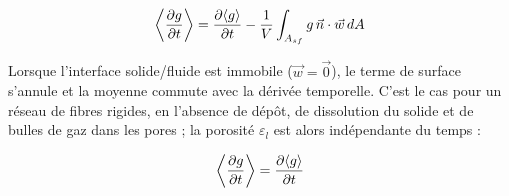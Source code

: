 \begin{equation}
\left\langle \frac{\partial g}{\partial t} \right\rangle
= \frac{\partial \langle g \rangle}{\partial t}
- \frac{1}{V}\int_{A_{sf}} g\,\vec{n}\cdot\vec{w}\, dA
\label{eq:transport_gen}
\end{equation}

Lorsque l'interface solide/fluide est immobile ($\vec{w} = \vec{0}$), le terme
de surface s'annule et la moyenne commute avec la dérivée temporelle. C'est
le cas pour un réseau de fibres rigides, en l'absence de dépôt, de
dissolution du solide et de bulles de gaz dans les pores ; la porosité
$\varepsilon_l$ est alors indépendante du temps :

\begin{equation}
\left\langle \frac{\partial g}{\partial t} \right\rangle = \frac{\partial \langle g \rangle}{\partial t} \label{eq:transport}
\end{equation}

\bigskip

